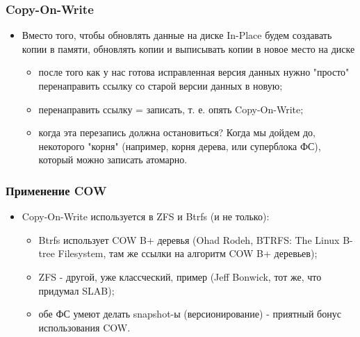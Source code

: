 \begin{frame}
\frametitle{Copy-On-Write}
\begin{itemize}
  \item Вместо того, чтобы обновлять данные на диске In-Place будем создавать
  копии в памяти, обновлять копии и выписывать копии в новое место на диске
  \begin{itemize}
    \item после того как у нас готова исправленная версия данных нужно "просто"
    перенаправить ссылку со старой версии данных в новую;
    \item перенаправить ссылку = записать, т. е. опять Copy-On-Write;
    \item когда эта перезапись должна остановиться? Когда мы дойдем до,
    некоторого "корня" (например, корня дерева, или суперблока ФС), который
    можно записать атомарно.
  \end{itemize}
\end{itemize}
\end{frame}

\begin{frame}
\frametitle{Применение COW}
\begin{itemize}
  \item Copy-On-Write используется в ZFS и Btrfs (и не только):
  \begin{itemize}
    \item Btrfs использует COW B+ деревья (Ohad Rodeh, BTRFS: The Linux B-tree
    Filesystem, там же ссылки на алгоритм COW B+ деревьев);
    \item ZFS - другой, уже классческий, пример (Jeff Bonwick, тот же, что
    придумал SLAB);
    \item обе ФС умеют делать snapshot-ы (версионирование) - приятный бонус
    использования COW.
  \end{itemize}
\end{itemize}
\end{frame}
